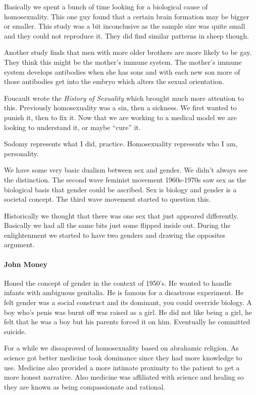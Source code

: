 \documentclass{article}
\begin{document}
Basically we spent a bunch of time looking for a biological cause of homosexuality. This one guy found that a certain brain formation may be bigger or smaller. This study was a bit inconclusive as the sample size was quite small and they could not reproduce it. They did find similar patterns in sheep though.

Another study finds that men with more older brothers are more likely to be gay. They think this might be the mother's immune system. The mother's immune system develops antibodies when she has sons and with each new son more of those antibodies get into the embryo which alters the sexual orientation.

Foucault wrote the \emph{History of Sexuality} which brought much more attention to this. Previously homosexuality was a sin, then a sickness. We first wanted to punish it, then to fix it. Now that we are working to a medical model we are looking to understand it, or maybe ``cure'' it.

Sodomy represents what I did, practice. Homosexuality represents who I am, personality.

We have some very basic dualism between sex and gender. We didn't always see the distinction. The second wave feminist movement 1960s-1970s saw sex as the biological basis that gender could be ascribed. Sex is biology and gender is a societal concept. The third wave movement started to question this.

Historically we thought that there was one sex that just appeared differently. Basically we had all the same bits just some flipped inside out. During the enlightenment we started to have two genders and drawing the opposites argument.

\paragraph{John Money}
\label{par:john_money}
Honed the concept of gender in the context of 1950's. He wanted to handle infants with ambiguous genitalia. He is famous for a disastrous experiment. He felt gender was a social construct and its dominant, you could override biology. A boy who's penis was burnt off was raised as a girl. He did not like being a girl, he felt that he was a boy but his parents forced it on him. Eventually he committed suicide.

For a while we dissaproved of homosexuality based on abrahamic religion. As science got better medicine took dominance since they had more knowledge to use. Medicine also provided a more intimate proximity to the patient to get a more honest narrative. Also medicine was affiliated with science and healing so they are known as being compassionate and rational.
\end{document}
